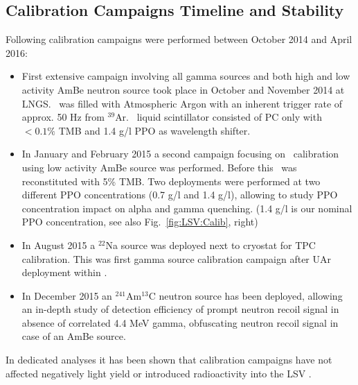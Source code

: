 \subsection{Calibration Campaigns Timeline and Stability}
Following calibration campaigns were performed between October 2014 and April 2016:
\begin{itemize}
\item First extensive campaign involving all gamma sources and both high and low activity AmBe neutron source took place in October and November 2014 at LNGS. \tpc\ was filled with Atmospheric Argon  with an inherent trigger rate of approx. 50 Hz from $^{39}$Ar. \lsv\ liquid scintillator consisted of PC only with $<0.1 \%$ TMB and 1.4 g/l PPO as wavelength shifter.

\item In January and February 2015 a second campaign focusing on \lsv\ calibration using low activity AmBe source was performed. Before this \lsv\ was reconstituted with 5\% TMB. Two deployments were performed at two different PPO concentrations (0.7 g/l and 1.4 g/l), allowing to study PPO concentration impact on alpha and gamma quenching. (1.4 g/l is our nominal PPO concentration, see also Fig.~\ref{fig:LSV:Calib}, right)

\item In August 2015 a $^{22}$Na source was deployed next to cryostat for TPC calibration. This was first gamma source calibration campaign after UAr deployment within \dsf.
\item In December 2015 an $^{241}$Am$^{13}$C neutron source has been deployed, allowing an in-depth study of detection efficiency of prompt neutron recoil signal in absence of correlated 4.4 MeV gamma, obfuscating neutron recoil signal in case of an AmBe source.
\end{itemize}

In dedicated analyses it has been shown that calibration campaigns have not affected negatively light yield or introduced radioactivity into the LSV \cite{Agnes:2015qyz}.



